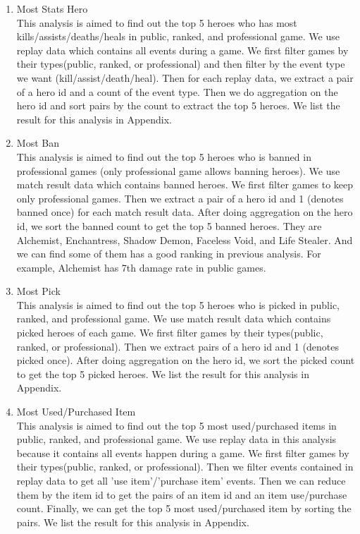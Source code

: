 \documentclass{article}
\begin{document}
\begin{enumerate}
    \item Most Stats Hero \\
    This analysis is aimed to find out the top 5 heroes who has most kills/assists/deaths/heals in public, ranked, and professional game. We use replay data which contains all events during a game. We first filter games by their types(public, ranked, or professional) and then filter by the event type we want (kill/assist/death/heal). Then for each replay data, we extract a pair of a hero id and a count of the event type. Then we do aggregation on the hero id and sort pairs by the count to extract the top 5 heroes. We list the result for this analysis in Appendix.
    \item Most Ban \\
    This analysis is aimed to find out the top 5 heroes who is banned in professional games (only professional game allows banning heroes). We use match result data which contains banned heroes. We first filter games to keep only professional games. Then we extract a pair of a hero id and 1 (denotes banned once) for each match result data. After doing aggregation on the hero id, we sort the banned count to get the top 5 banned heroes. They are Alchemist, Enchantress, Shadow Demon, Faceless Void, and Life Stealer. And we can find some of them has a good ranking in previous analysis. For example, Alchemist has 7th damage rate in public games.
    \item Most Pick \\
    This analysis is aimed to find out the top 5 heroes who is picked in public, ranked, and professional game. We use match result data which contains picked heroes of each game. We first filter games by their types(public, ranked, or professional). Then we extract pairs of a hero id and 1 (denotes picked once). After doing aggregation on the hero id, we sort the picked count to get the top 5 picked heroes. We list the result for this analysis in Appendix.
    \item Most Used/Purchased Item \\
    This analysis is aimed to find out the top 5 most used/purchased items in public, ranked, and professional game. We use replay data in this analysis because it contains all events happen during a game. We first filter games by their types(public, ranked, or professional). Then we filter events contained in replay data to get all 'use item'/'purchase item' events. Then we can reduce them by the item id to get the pairs of an item id and an item use/purchase count. Finally, we can get the top 5 most used/purchased item by sorting the pairs. We list the result for this analysis in Appendix.

\end{enumerate}
\end{document}
